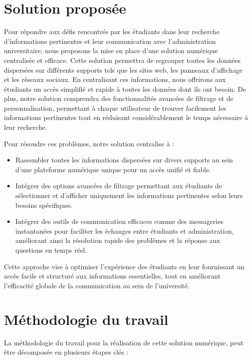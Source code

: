 \begin{sloppypar}
\section{Solution proposée}
\vspace{-4mm}
\adjustmtc
\thispagestyle{MyStyle}
\vspace{-4mm}
Pour répondre aux défis rencontrés par les étudiants dans leur recherche d’informations pertinentes et leur communication avec l’administration universitaire, nous proposons la mise en place d’une solution numérique centralisée et efficace. Cette solution permettra de regrouper toutes les données dispersées sur différents supports tels que les sites web, les panneaux d’affichage et les réseaux sociaux. En centralisant ces informations, nous offrirons aux étudiants un accès simplifié et rapide à toutes les données dont ils ont besoin. De plus, notre solution comprendra des fonctionnalités avancées de filtrage et de personnalisation, permettant à chaque utilisateur de trouver facilement les informations pertinentes tout en réduisant considérablement le temps nécessaire à leur recherche.

Pour résoudre ces problèmes, notre solution centralise à :
\begin{itemize}
    \item Rassembler toutes les informations dispersées sur divers supports au sein d'une plateforme numérique unique pour un accès unifié et fiable.
    \item Intégrer des options avancées de filtrage permettant aux étudiants de sélectionner et d'afficher uniquement les informations pertinentes selon leurs besoins spécifiques.
    \item Intégrer des outils de communication efficaces comme des messageries instantanées pour faciliter les échanges entre étudiants et administration, améliorant ainsi la résolution rapide des problèmes et la réponse aux questions en temps réel.
\end{itemize}

Cette approche vise à optimiser l'expérience des étudiants en leur fournissant un accès facile et structuré aux informations essentielles, tout en améliorant l'efficacité globale de la communication au sein de l'université.

\vspace{-6mm}
\section{Méthodologie du travail }
\vspace{-4mm}
La méthodologie du travail pour la réalisation de cette solution numérique, peut être décomposée en plusieurs étapes clés :


\end{sloppypar}

